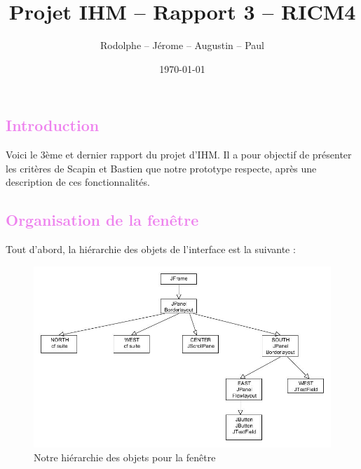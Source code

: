 \documentclass[12pt, a4paper]{article}
\title{Projet IHM -- Rapport 3 -- RICM4}
\author{\bsc{Fréby} Rodolphe -- \bsc{Barbier} Jérome -- \bsc{Husson} Augustin -- \bsc{Labat} Paul}
\date{\today}
\begin{document}
\maketitle
\tableofcontents
\newpage

\textcolor{Violet}{\section{Introduction}}
Voici le 3ème et dernier rapport du projet d'IHM. Il a pour objectif de présenter les critères de Scapin et Bastien que notre prototype respecte, après une description de ces fonctionnalités.

\textcolor{Violet}{\section{Organisation de la fenêtre}}

Tout d'abord, la hiérarchie des objets de l'interface est la suivante :

\begin{figure}[h]
\begin{center}
   \includegraphics[scale = 0.5]{arbre_jframe.jpg}
	\caption{Notre hiérarchie des objets pour la fenêtre}
	\end{center}
\end{figure}
\end{document}
